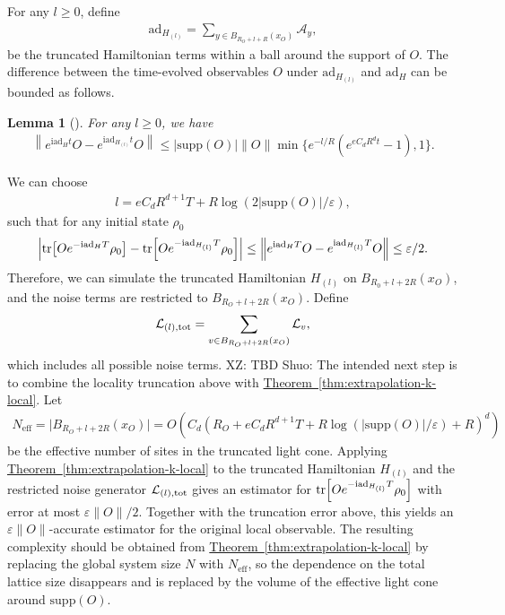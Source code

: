 \documentclass[11pt]{article}
\newtheorem{lemma}{Lemma}
\newcommand{\thm}[1]{\hyperref[thm:#1]{Theorem~\ref*{thm:#1}}}
\renewcommand{\i}{\mathrm{i}}
\renewcommand{\L}{\mathcal{L}}
\newcommand{\ad}{\mathrm{ad}}
\newcommand{\A}{\mathcal{A}}
\newcommand{\supp}{\mathrm{supp}}
\newcommand{\eps}{\varepsilon}
\newcommand{\xz}[1]{{\color{cyan} XZ: #1}}
\newcommand{\sz}[1]{{\color{blue} Shuo: #1}}
\begin{document}
For any $l \ge 0$, define\begin{align*}
    \ad_{H_{(l)}} = \sum_{y\in B_{R_O+l+R}(x_O)} \A_y,
\end{align*}
be the truncated Hamiltonian terms within a ball around the support of $O$. The difference between the time-evolved observables $O$ under $\ad_{H_{(l)}}$ and $ \ad_H$ can be bounded as follows. 
\begin{lemma}[{\cite[Lemma 2]{rao2025stability}}]
    For any $l\ge 0$, we have \begin{align*}
        \left\| e^{\i \ad_H t}O - e^{\i \ad_{H_{(l)}}t}O\right\| \le |\supp(O)|\|O\|\min\{e^{-l/R}(e^{eC_dR^d t}-1), 1\}.
    \end{align*}
\end{lemma}
We can choose \begin{align*}
    l = eC_d R^{d+1}T+ R\log(2|\supp(O)|/\eps),
\end{align*}
such that for any initial state $\rho_0$ \begin{align*}
    \left| \tr[Oe^{-\i \ad_H T}\rho_0]- \tr[Oe^{-\i \ad_{H_{(l)}} T}\rho_0]\right| \le \left\| e^{\i \ad_HT}O - e^{\i \ad_{H_{(l)}}T}O\right\| \le \eps/2.
\end{align*}
Therefore, we can simulate the truncated Hamiltonian $H_{(l)}$ on $B_{R_0+l+2R}(x_O)$,  and the noise terms are restricted to $B_{R_O+l+2R}(x_O)$. Define
\begin{align*}
     \L_{(l), \rm tot} =  \sum_{v\in B_{R_O+l+2R}(x_O)} \L_v,
\end{align*}
which includes all possible noise terms. 
\xz{TBD}
\sz{The intended next step is to combine the locality truncation above with \thm{extrapolation-k-local}. Let
\begin{align*}
    N_{\mathrm{eff}} = \big|B_{R_O+l+2R}(x_O)\big| = O\!\left(C_d(R_O+eC_dR^{d+1}T+R\log(|\supp(O)|/\eps)+R)^d\right)
\end{align*}
be the effective number of sites in the truncated light cone. Applying \thm{extrapolation-k-local} to the truncated Hamiltonian $H_{(l)}$ and the restricted noise generator $\L_{(l),\rm tot}$ gives an estimator for $\tr[Oe^{-\i\ad_{H_{(l)}}T}\rho_0]$ with error at most $\eps\|O\|/2$. Together with the truncation error above, this yields an $\eps\|O\|$-accurate estimator for the original local observable. The resulting complexity should be obtained from \thm{extrapolation-k-local} by replacing the global system size $N$ with $N_{\mathrm{eff}}$, so the dependence on the total lattice size disappears and is replaced by the volume of the effective light cone around $\supp(O)$.}
\end{document}
